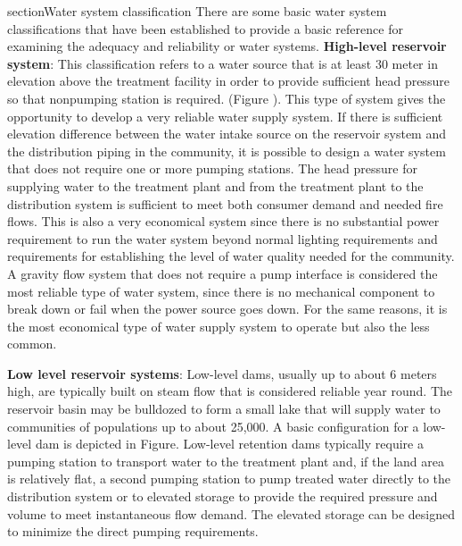 section{Water system classification}
There are some basic water system classifications that have been established to provide a basic 
reference for examining the adequacy and reliability or water systems. 
\bigbreak
\textbf{High-level reservoir system}: This classification refers to a water source that is at least 
30 meter in elevation above the treatment facility in order to provide sufficient head pressure 
so that nonpumping station is required. (Figure ). This type of system gives the opportunity to 
develop a very reliable water supply system. If there is sufficient elevation difference between
the water intake source on the reservoir system and the distribution piping in the community, 
it is possible to design a water system that does not require one or more pumping stations. 
The head pressure for supplying water to the treatment plant and from the treatment plant to 
the distribution system is sufficient to meet both consumer demand and needed fire flows. 
This is also a very economical system since there is no substantial power requirement to run 
the water system beyond normal lighting requirements and requirements for establishing the level
of water quality needed for the community. A gravity flow system that does not require a pump 
interface is considered the most reliable type of water system, since there is no mechanical 
component to break down or fail when the power source goes down. For the same reasons, it is the
most economical type of water supply system to operate but also the less common.


\begin{figure}
    
\end{figure}

\textbf{Low level reservoir systems}: Low-level dams, usually up to about 6 meters high, are typically 
built on steam flow that is considered reliable year round. The reservoir basin may be bulldozed 
to form a small lake that will supply water to communities of populations up to about 25,000. 
A basic configuration for a low-level dam is depicted in Figure.  Low-level retention dams 
typically require a pumping station to transport water to the treatment plant and, if the land 
area is relatively flat, a second pumping station to pump treated water directly to the 
distribution system or to elevated storage to provide the required pressure and volume to meet 
instantaneous flow demand. The elevated storage can be designed to minimize the direct pumping 
requirements.


\begin{figure}
    
\end{figure}

